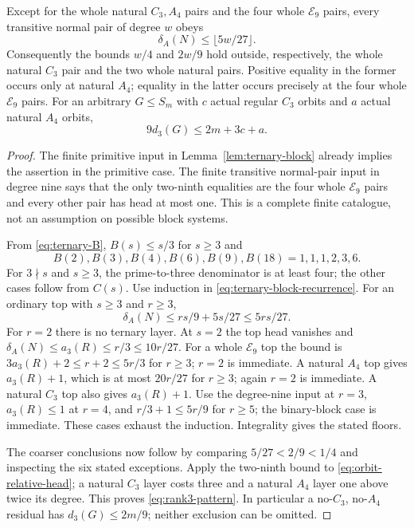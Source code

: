 \begin{theorem}\label{thm:rank3-stability}
Except for the whole natural $C_3,A_4$ pairs and the four whole
$\mathcal E_9$ pairs, every transitive normal pair of degree $w$ obeys
\[
 \delta_A(N)\leq\lfloor5w/27\rfloor.
\]
Consequently the bounds $w/4$ and $2w/9$ hold outside, respectively,
the whole natural $C_3$ pair and the two whole natural pairs.
Positive equality in the former occurs only at natural $A_4$;
equality in the latter occurs precisely at the four whole
$\mathcal E_9$ pairs.
For an arbitrary $G\leq S_m$ with $c$ actual regular $C_3$ orbits
and $a$ actual natural $A_4$ orbits,
\begin{equation}\label{eq:rank3-pattern}
 9d_3(G)\leq2m+3c+a.
\end{equation}
\end{theorem}
\begin{proof}
The finite primitive input in Lemma~\ref{lem:ternary-block} already
implies the assertion in the primitive case. The finite transitive
normal-pair input in degree nine says that the only two-ninth
equalities are the four whole $\mathcal E_9$ pairs and every other
pair has head at most one. This is a complete finite catalogue,
not an assumption on possible block systems.

From \eqref{eq:ternary-B}, $B(s)\leq s/3$ for $s\geq3$ and
\[
 B(2),B(3),B(4),B(6),B(9),B(18)=1,1,1,2,3,6.
\]
For $3\nmid s$ and $s\geq3$, the prime-to-three denominator is
at least four; the other cases follow from $C(s)$.
Use induction in \eqref{eq:ternary-block-recurrence}. For an ordinary
top with $s\geq3$ and $r\geq3$,
\[
 \delta_A(N)\leq rs/9+5s/27\leq5rs/27.
\]
For $r=2$ there is no ternary layer. At $s=2$ the top head vanishes
and $\delta_A(N)\leq a_3(R)\leq r/3\leq10r/27$.
For a whole $\mathcal E_9$ top the bound is
$3a_3(R)+2\leq r+2\leq5r/3$ for $r\geq3$;
$r=2$ is immediate. A natural $A_4$ top gives $a_3(R)+1$,
which is at most $20r/27$ for $r\geq3$; again $r=2$ is immediate.
A natural $C_3$ top also gives $a_3(R)+1$. Use the degree-nine
input at $r=3$, $a_3(R)\leq1$ at $r=4$, and
$r/3+1\leq5r/9$ for $r\geq5$; the binary-block case is immediate.
These cases exhaust the induction. Integrality gives the stated floors.

The coarser conclusions now follow by comparing $5/27<2/9<1/4$
and inspecting the six stated exceptions. Apply the two-ninth bound
to \eqref{eq:orbit-relative-head}; a natural $C_3$ layer costs three
and a natural $A_4$ layer one above twice its degree. This proves
\eqref{eq:rank3-pattern}. In particular a no-$C_3$, no-$A_4$
residual has $d_3(G)\leq2m/9$; neither exclusion can be omitted.
\end{proof}

